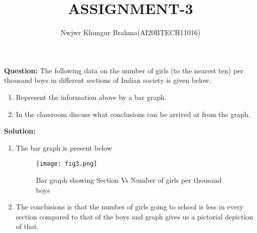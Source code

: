 \documentclass[journal,12pt,twocolumn]{IEEEtran}
\begin{document}
\vspace{3cm}
\title{ASSIGNMENT-3}
\author{Nwjwr Khungur Brahma(AI20BTECH11016)}
\maketitle
\textbf{Question:}
The following data on the number of girls (to the nearest ten) per thousand boys in different sections of Indian society is given below.
\begin{table}[!ht]
  
\end{table}
\begin{enumerate}
\item Represent the information above by a bar graph.
\item In the classroom discuss what conclusions can be arrived at from the graph.
\end{enumerate}
\textbf{Solution:}
\begin{enumerate}
\item The bar graph is present below
\begin{figure}[!ht]
\centering
\texttt{[image: fig3.png]}
\caption{Bar graph showing Section Vs Number of girls per thousand boys}
\end{figure}
\hspace{3cm}
\item The conclusions is that the number of girls going to school is less in every section compared to that of the boys and graph gives us a pictorial depiction of that.
\end{enumerate}
\end{document}
